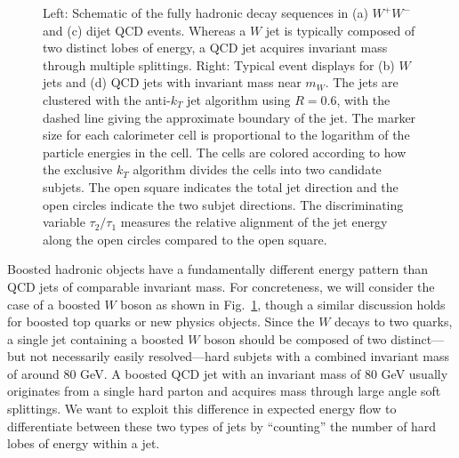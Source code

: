 \documentclass{JHEP3}
\DeclareRobustCommand{\Fig}[1]{Fig.~\ref{#1}}
\begin{document}
\begin{figure}[tp]
  \begin{center}
  \end{center}
  \caption{Left:  Schematic of the fully hadronic decay sequences in (a) $W^+ W^-$ and (c) dijet QCD events.  Whereas a $W$ jet is typically composed of two distinct lobes of energy, a QCD jet acquires invariant mass through multiple splittings.  Right:  Typical event displays for (b) $W$ jets and (d) QCD jets with invariant mass near $m_W$.  The jets are clustered with the anti-$k_T$ jet algorithm \cite{Cacciari:2008gp} using $R= 0.6$, with the dashed line giving the approximate boundary of the jet.   The marker size for each calorimeter cell is proportional to the logarithm of the particle energies in the cell.  The cells are colored according to how the exclusive $k_T$ algorithm divides the cells into two candidate subjets.  The open square indicates the total jet direction and the open circles indicate the two subjet directions.  The discriminating variable $\tau_2/\tau_1$ measures the relative alignment of the jet energy along the open circles compared to the open square.}
  \label{fig:eventDisplaysW}
\end{figure}


Boosted hadronic objects have a fundamentally different energy pattern than QCD jets of comparable invariant mass.  For concreteness, we will consider the case of a boosted $W$ boson as shown in \Fig{fig:eventDisplaysW}, though a similar discussion holds for boosted top quarks or new physics objects.  Since the $W$ decays to two quarks, a single jet containing a boosted $W$ boson should be composed of two distinct---but not necessarily easily resolved---hard subjets with a combined invariant mass of around 80 GeV.  A boosted QCD jet with an invariant mass of 80 GeV usually originates from a single hard parton and acquires mass through large angle soft splittings.  We want to exploit this difference in expected energy flow to differentiate between these two types of jets by ``counting'' the number of hard lobes of energy within a jet.
\end{document}
